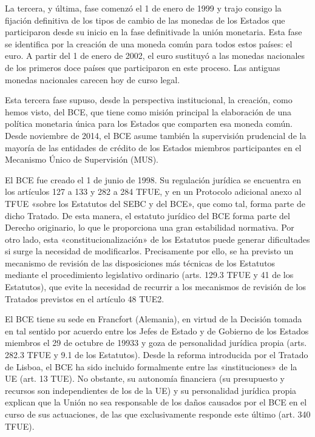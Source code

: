 \documentclass[10pt,a4paper]{article}
\newcounter{anexo}
\begin{document}
La tercera, y última, fase comenzó el 1 de enero de 1999 y trajo consigo la fijación definitiva de los tipos de cambio de las monedas de los Estados que participaron desde su inicio en la fase definitivade la unión monetaria. Esta fase se identifica por la creación de una moneda común para todos estos países: el euro. A partir del 1 de enero de 2002, el euro sustituyó a las monedas nacionales de los primeros doce países que participaron en este proceso. Las antiguas monedas nacionales carecen hoy de curso legal.

Esta tercera fase supuso, desde la perspectiva institucional, la creación, como hemos visto, del BCE, que tiene como misión principal la elaboración de una política monetaria única para los Estados que comparten esa moneda común. Desde noviembre de 2014, el BCE asume también la supervisión prudencial de la mayoría de las entidades de crédito de los Estados miembros participantes en el Mecanismo Único de Supervisión (MUS).

El BCE fue creado el 1 de junio de 1998. Su regulación jurídica se encuentra en los artículos 127 a 133 y 282 a 284 TFUE, y en un Protocolo adicional anexo al TFUE «sobre los Estatutos del SEBC y del BCE», que como tal, forma parte de dicho Tratado. De esta manera, el estatuto jurídico del BCE forma parte del Derecho originario, lo que le proporciona una gran estabilidad normativa. Por otro lado, esta «constitucionalización» de los Estatutos puede generar dificultades si surge la necesidad de modificarlos. Precisamente por ello, se ha previsto un mecanismo de revisión de las disposiciones más técnicas de los Estatutos mediante el procedimiento legislativo ordinario (arts. 129.3 TFUE y 41 de los Estatutos), que evite la necesidad de recurrir a los mecanismos de revisión de los Tratados previstos en el artículo 48 TUE2.

El BCE tiene su sede en Francfort (Alemania), en virtud de la Decisión tomada en tal sentido por acuerdo entre los Jefes de Estado y de Gobierno de los Estados miembros el 29 de octubre de 19933 y goza de personalidad jurídica propia (arts. 282.3 TFUE y 9.1 de los Estatutos). Desde la reforma introducida por el Tratado de Lisboa, el BCE ha sido incluido formalmente entre las «instituciones» de la UE (art. 13 TUE). No obstante, su autonomía financiera (su presupuesto y recursos son independientes de los de la UE) y su personalidad jurídica propia explican que la Unión no sea responsable de los daños causados por el BCE en el curso de sus actuaciones, de las que exclusivamente responde este último (art. 340 TFUE). 
\end{document}
